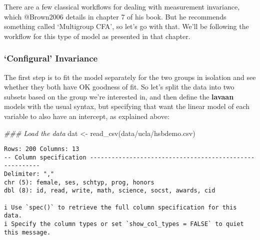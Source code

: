 \documentclass[
  letterpaper,
  DIV=11,
  numbers=noendperiod]{scrreprt}
\newenvironment{Shaded}{\begin{snugshade}}{\end{snugshade}}
\newcommand{\DocumentationTok}[1]{\textcolor[rgb]{0.37,0.37,0.37}{\textit{#1}}}
\newcommand{\FunctionTok}[1]{\textcolor[rgb]{0.28,0.35,0.67}{#1}}
\newcommand{\NormalTok}[1]{\textcolor[rgb]{0.00,0.23,0.31}{#1}}
\newcommand{\OtherTok}[1]{\textcolor[rgb]{0.00,0.23,0.31}{#1}}
\newcommand{\StringTok}[1]{\textcolor[rgb]{0.13,0.47,0.30}{#1}}
\begin{document}
There are a few classical workflows for dealing with measurement
invariance, which @Brown2006 details in chapter 7 of his book. But he
recommends something called `Multigroup CFA', so let's go with that.
We'll be following the workflow for this type of model as presented in
that chapter.

\hypertarget{configural-invariance}{%
\subsubsection{`Configural' Invariance}\label{configural-invariance}}

The first step is to fit the model separately for the two groups in
isolation and see whether they both have OK goodness of fit. So let's
split the data into two subsets based on the group we're interested in,
and then define the \textbf{lavaan} models with the usual syntax, but
specifying that want the linear model of each variable to also have an
intercept, as explained above:

\begin{Shaded}
\begin{Highlighting}[]
\DocumentationTok{\#\#\# Load the data}
\NormalTok{dat }\OtherTok{\textless{}{-}} \FunctionTok{read\_csv}\NormalTok{(}\StringTok{\textquotesingle{}data/ucla/hsbdemo.csv\textquotesingle{}}\NormalTok{)}
\end{Highlighting}
\end{Shaded}

\begin{verbatim}
Rows: 200 Columns: 13
-- Column specification --------------------------------------------------------
Delimiter: ","
chr (5): female, ses, schtyp, prog, honors
dbl (8): id, read, write, math, science, socst, awards, cid

i Use `spec()` to retrieve the full column specification for this data.
i Specify the column types or set `show_col_types = FALSE` to quiet this message.
\end{verbatim}
\end{document}
